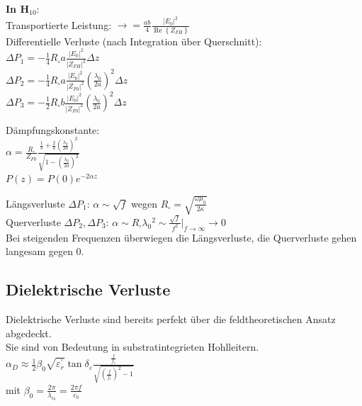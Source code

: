 \documentclass[english]{latex4ei/latex4ei_sheet}
\begin{document}
\begin{sectionbox}
	\textbf{In H$_{10}$}:\\
	Transportierte Leistung: $\rightarrow = \frac{a b}{4} \frac{\left|E_{0}\right|^{2}}{\operatorname{Re}\left\{Z_{F H}\right\}}$\\
	Differentielle Verluste (nach Integration über Querschnitt):\\
	$\Delta P_{1}=-\frac{1}{4} R_{\square} a \frac{\left|E_{0}\right|^{2}}{\left|Z_{F H}\right|^{2}} \Delta z$\\
	$\Delta P_{2}=-\frac{1}{4} R_{\square} a \frac{\left|E_{0}\right|^{2}}{\left|Z_{F 0}\right|^{2}}\left(\frac{\lambda_{0}}{2 a}\right)^{2} \Delta z$ \\
	$\Delta P_{3}=-\frac{1}{2} R_{\square} b \frac{\left|E_{0}\right|^{2}}{\left|Z_{F 0}\right|^{2}}\left(\frac{\lambda_{0}}{2 a}\right)^{2} \Delta z$\\
	\begin{emphbox}
		Dämpfungskonstante:\\
		$\alpha=\frac{R_{\square}}{Z_{F 0}} \frac{\frac{1}{b}+\frac{2}{a}\left(\frac{\lambda_{0}}{2 a}\right)^{2}}{\sqrt{1-\left(\frac{\lambda_{0}}{2 a}\right)^{2}}}$\\ 
		$P(z) = P(0) e^{-2\alpha z}$ 
	\end{emphbox}

	Längsverluste $\Delta P_{1}$: $\alpha \sim \sqrt{f}$ wegen $R_{\square}=\sqrt{\frac{\omega \mu_{0}}{2 \kappa}}$\\ 
	Querverluste $\Delta P_{2}, \Delta P_{3}$: $\alpha \sim R_{\square} \lambda_{0}{ }^{2} \sim \frac{\sqrt{f}}{f^{2}}|_{f \rightarrow \infty} \rightarrow 0$\\ 
	Bei steigenden Frequenzen überwiegen die Längsverluste, die Querverluste gehen langesam gegen 0.

\end{sectionbox}

\begin{sectionbox}
	\subsection{Dielektrische Verluste}
	Dielektrische Verluste sind bereits perfekt über die feldtheoretischen Ansatz abgedeckt.\\
	Sie sind von Bedeutung in substratintegrieten Hohlleitern.\\
	$\alpha_{D} \approx \frac{1}{2} \beta_{0} \sqrt{\varepsilon_{r}^{\prime}} \tan \delta_{\varepsilon} \frac{\frac{f}{f_{c}}}{\sqrt{\left(\frac{f}{f_{c}}\right)^{2}-1}}$\\
	mit $\beta_0 = \frac{2 \pi}{\lambda_{c_0}} = \frac{2 \pi f}{c_0}$
\end{sectionbox}
\end{document}
